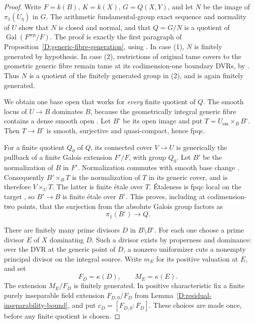 \begin{proof}
Write $F=k(B)$, $K=k(X)$, $G=Q(X,Y)$, and let $N$ be
the image of $\pi_1(U_{\overline\eta})$ in $G$.
The arithmetic fundamental-group exact sequence and
normality of $U$ show that $N$ is closed and normal,
and that $Q=G/N$ is a quotient of
$\operatorname{Gal}(F^{\mathrm{sep}}/F)$.
The proof is exactly the first paragraph of
Proposition~\ref{D:generic-fibre-generation}, using
\cite[Lemma 58.14.3, tag 0BTX]{C_StacksGenericFibre}.
In case (1), $N$ is finitely generated by hypothesis.
In case (2), restrictions of original tame covers to
the geometric generic fibre remain tame at its
codimension-one boundary DVRs, by
\cite[Lemma 15.116.9, tag 0EXY]{C_StacksLogFibration}.
Thus $N$ is a quotient of the finitely generated group
in (2), and is again finitely generated.

We obtain one base open that works for \emph{every}
finite quotient of $Q$.  The smooth locus of $U\to B$
dominates $B$, because the geometrically integral generic
fibre contains a dense smooth open
\cite[Lemma 33.25.7, tag 056V]{C_StacksGenericFibre}.
Let $B^\circ$ be its open image and put
$T=U_{\mathrm{sm}}\times_B B^\circ$.
Then $T\to B^\circ$ is smooth, surjective and
quasi-compact, hence fpqc.

For a finite quotient $Q_0$ of $Q$, its connected cover
$V\to U$ is generically the pullback of a finite Galois
extension $F'/F$, with group $Q_0$.  Let $B'$ be the
normalization of $B$ in $F'$.  Normalization commutes
with smooth base change
\cite[Lemma 37.19.2, tag 03GV]{C_StacksProjectiveBase}.
Consequently $B'\times_B T$ is the normalization of
$T$ in its generic cover, and is therefore $V\times_U T$.
The latter is finite \'etale over $T$.  \'Etaleness is
fpqc local on the target
\cite[Lemma 35.23.31, tag 02VN]{C_StacksProjectiveBase},
so $B'\to B$ is finite \'etale over $B^\circ$.
This proves, including at codimension-two points, that
the surjection from the absolute Galois group factors as
\[
                         \pi_1(B^\circ)\longrightarrow Q.
\]

There are finitely many prime divisors $D$ in
$B\setminus B^\circ$.  For each one choose a prime divisor
$E$ of $X$ dominating $D$.  Such a divisor exists by
properness and dominance: over the DVR at the generic
point of $D$, a nonzero uniformizer cuts a nonempty
principal divisor on the integral source.  Write $m_E$
for its positive valuation at $E$, and set
\[
                        F_D=\kappa(D),\qquad M_E=\kappa(E).
\]
The extension $M_E/F_D$ is finitely generated.  In positive
characteristic fix a finite purely inseparable field
extension $F_{D,0}/F_D$ from
Lemma~\ref{D:residual-inseparability-bound}, and put
$c_D=[F_{D,0}:F_D]$.  These choices are made once, before
any finite quotient is chosen.


\end{proof}
